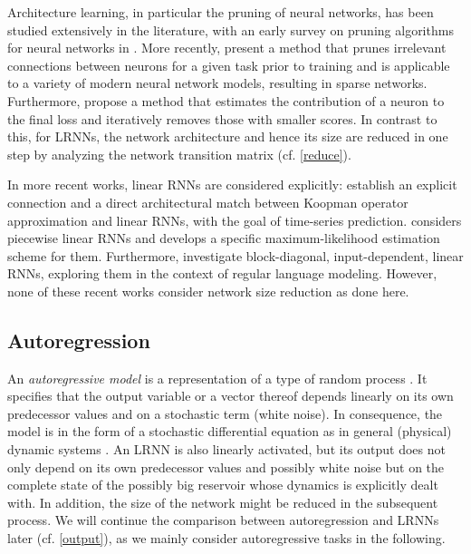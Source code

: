 \documentclass{sn-jnl}
\theoremstyle{definition}
\begin{document}
Architecture learning, in particular the pruning of neural networks, has been
studied extensively in the literature, with an early survey on pruning algorithms
for neural networks in \citep{Ree93}. More recently, \citet{LAT19} present
a method that prunes irrelevant connections between
neurons for a given task prior to training and is applicable to a variety of
modern neural network models, resulting in sparse networks. Furthermore,
\citet{MM+19} propose a method that estimates the contribution of a neuron to
the final loss and iteratively removes those with smaller scores. In contrast to
this, for LRNNs, the network architecture and hence its size are reduced in one
step by analyzing the network transition matrix (cf. \cref{reduce}).

In more recent works, linear RNNs are considered explicitly: \citet{ZM+25}
establish an explicit connection and a direct architectural match between
Koopman operator approximation and linear RNNs, with the goal of time-series
prediction. \citet{Dur17} considers piecewise linear RNNs and develops a
specific maximum-likelihood estimation scheme for them. Furthermore,
\citet{FCR24} investigate block-diagonal, input-dependent, linear RNNs,
exploring them in the context of regular language modeling. However, none of
these recent works consider network size reduction as done here.

\subsection{Autoregression}\label{regress}

An \emph{autoregressive model} is a representation of a type of random process
\citep{Aka69}. It specifies that the output variable or a vector thereof depends
linearly on its own predecessor values and on a stochastic term (white noise). In
consequence, the model is in the form of a stochastic differential equation as in
general (physical) dynamic systems \citep{CK14}. An LRNN is also linearly
activated, but its output does not only depend on its own predecessor values and
possibly white noise but on the complete state of the possibly big reservoir
whose dynamics is explicitly dealt with. In addition, the size of the network
might be reduced in the subsequent process. We will continue the comparison
between autoregression and LRNNs later (cf. \cref{output}), as we mainly consider
autoregressive tasks in the following.
\end{document}
